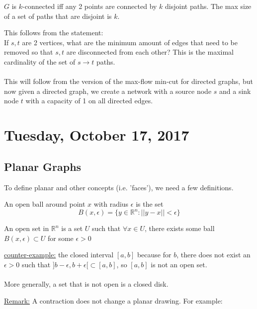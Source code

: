\documentclass[12pt]{article}
\begin{document}
\begin{tcolorbox}[title=Menger's Theorem]
	$G$ is $k$-connected iff any 2 points are connected by $k$ disjoint paths. The max size of a set of paths that are disjoint is $k$.
\end{tcolorbox}

This follows from the statement:\\
If $s,t$ are 2 vertices, what are the minimum amount of edges that need to be removed so that $s,t$ are disconnected from each other? This is the maximal cardinality of the set of $s\rightarrow t$ paths.\\
\\
This will follow from the version of the max-flow min-cut for directed graphs, but now given a directed graph, we create a network with a source node $s$ and a sink node $t$ with a capacity of 1 on all directed edges.

\newpage

\section{Tuesday, October 17, 2017}

\subsection{Planar Graphs}

To define planar and other concepts (i.e. 'faces'), we need a few definitions.

\begin{tcolorbox}[title=Definition: Open Ball]
	An open ball around point $x$ with radius $\epsilon$ is the set $$B(x,\epsilon ) = \{ y \in\mathbb{R}^n : ||y-x||<\epsilon \}$$
\end{tcolorbox}

\begin{tcolorbox}[title=Definition: Open set]
	An open set in $\mathbb{R}^n$ is a set $U$ such that $\forall x \in U$, there exists some ball $B(x,\epsilon ) \subset U$ for some $\epsilon > 0$
\end{tcolorbox}

\underline{counter-example:} the closed interval $[a,b]$ because for $b$, there does not exist an $\epsilon > 0$ such that $]b-\epsilon, b+\epsilon[ \subset [a,b]$, so $[a,b]$ is not an open set.\\
\\
More generally, a set that is not open is a closed disk.

\underline{Remark:} A contraction does not change a planar drawing. For example:
	
\end{document}

